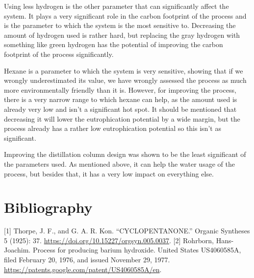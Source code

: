 \documentclass[11pt]{article}
\begin{document}
Using less hydrogen is the other parameter that can significantly affect the system. It plays a very significant role in the carbon footprint of the process and is the parameter to which the system is the most sensitive to. Decreasing the amount of hydrogen used is rather hard, but replacing the gray hydrogen with something like green hydrogen has the potential of improving the carbon footprint of the process significantly.

Hexane is a parameter to which the system is very sensitive, showing that if we wrongly underestimated its value, we have wrongly assessed the process as much more environmentally friendly than it is. However, for improving the process, there is a very narrow range to which hexane can help, as the amount used is already very low and isn't a significant hot spot. It should be mentioned that decreasing it will lower the eutrophication potential by a wide margin, but the process already has a rather low eutrophication potential so this isn't as significant.

Improving the distillation column design was shown to be the least significant of the parameters used. As mentioned above, it can help the water usage of the process, but besides that, it has a very low impact on everything else.

\section{Bibliography}
\label{sec:orgc2dd01f}
[1] Thorpe, J. F., and G. A. R. Kon. “CYCLOPENTANONE.” Organic Syntheses 5 (1925): 37. \url{https://doi.org/10.15227/orgsyn.005.0037}.
[2] Rohrborn, Hans-Joachim. Process for producing barium hydroxide. United States US4060585A, filed February 20, 1976, and issued November 29, 1977. \url{https://patents.google.com/patent/US4060585A/en}.
\end{document}
